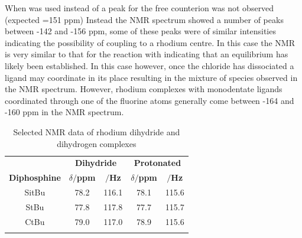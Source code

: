 When  was used instead of  a peak for the free  counterion was not observed (expected =151 ppm\cite{Feller2007})  Instead the \fluorine{} NMR spectrum showed a number of peaks between -142 and -156 ppm, some of these peaks were of similar intensities indicating the possibility of coupling to a rhodium centre.  In this case the \proton{} NMR is very similar to that for the reaction with  indicating that an equilibrium has likely been established.  In this case however, once the chloride has dissociated a  ligand may coordinate in its place resulting in the mixture of species observed in the \fluorine{} NMR spectrum.   However, rhodium complexes with monodentate  ligands coordinated through one of the fluorine atoms generally come between -164 and -160 ppm in the \fluorine{} NMR spectrum.\cite{Feller2007, Salem2006, Salem2008, Gandelman2003}



\begin{table}[htbp]
\caption[Selected NMR data of rhodium dihydride and dihydrogen complexes]{Selected NMR data of rhodium dihydride and dihydrogen complexes} 
\vspace{1em}
\label{table:dihydrogen}
\small
\begin{center}
\begin{tabular}{ c c c c c}
	\toprule{}
	~~ & \multicolumn{2}{c}{\bfseries{Dihydride}} & \multicolumn{2}{c}{\bfseries{Protonated}}\\
	\cmidrule(lr){2-3} \cmidrule(lr){4-5}
	\bfseries{Diphosphine}&\bfseries{$\delta$\phosphorus{}$/$ppm}&\bfseries{\JRhP$/$Hz}&\bfseries{$\delta$\phosphorus{}$/$ppm}&\bfseries{\JRhP$/$Hz}\\
	\midrule{}
	SitBu	&	78.2	&	116.1	&	78.1		&	115.6\\
	StBu		& 	77.8	&	117.8	&	77.7		&	115.7\\
	CtBu		&	79.0	&	117.0	&	78.9		&	115.6\\
	\bottomrule{}
\end{tabular}
\end{center}
\end{table}


